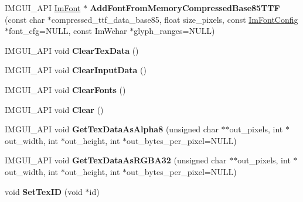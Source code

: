 \begin{DoxyCompactItemize}
\item 
\mbox{\label{struct_im_font_atlas_a8dc978f22a957a7486ab75faeb743813}} 
I\+M\+G\+U\+I\+\_\+\+A\+PI \mbox{\hyperlink{struct_im_font}{Im\+Font}} $\ast$ {\bfseries Add\+Font\+From\+Memory\+Compressed\+Base85\+T\+TF} (const char $\ast$compressed\+\_\+ttf\+\_\+data\+\_\+base85, float size\+\_\+pixels, const \mbox{\hyperlink{struct_im_font_config}{Im\+Font\+Config}} $\ast$font\+\_\+cfg=N\+U\+LL, const Im\+Wchar $\ast$glyph\+\_\+ranges=N\+U\+LL)
\item 
\mbox{\label{struct_im_font_atlas_a97804b3ed2e54b4df70137c88a495d70}} 
I\+M\+G\+U\+I\+\_\+\+A\+PI void {\bfseries Clear\+Tex\+Data} ()
\item 
\mbox{\label{struct_im_font_atlas_a53cc004ffd4bd989e227367eaeb0f142}} 
I\+M\+G\+U\+I\+\_\+\+A\+PI void {\bfseries Clear\+Input\+Data} ()
\item 
\mbox{\label{struct_im_font_atlas_a71af651bcbeb423b06c9b56ab7dc9749}} 
I\+M\+G\+U\+I\+\_\+\+A\+PI void {\bfseries Clear\+Fonts} ()
\item 
\mbox{\label{struct_im_font_atlas_a142f4c3bf3c8909df256ddabd77739c4}} 
I\+M\+G\+U\+I\+\_\+\+A\+PI void {\bfseries Clear} ()
\item 
\mbox{\label{struct_im_font_atlas_ae50261af7f9ba8c89f12814c8176afda}} 
I\+M\+G\+U\+I\+\_\+\+A\+PI void {\bfseries Get\+Tex\+Data\+As\+Alpha8} (unsigned char $\ast$$\ast$out\+\_\+pixels, int $\ast$out\+\_\+width, int $\ast$out\+\_\+height, int $\ast$out\+\_\+bytes\+\_\+per\+\_\+pixel=N\+U\+LL)
\item 
\mbox{\label{struct_im_font_atlas_ac7d71e342139a37e58864075ae39c4f3}} 
I\+M\+G\+U\+I\+\_\+\+A\+PI void {\bfseries Get\+Tex\+Data\+As\+R\+G\+B\+A32} (unsigned char $\ast$$\ast$out\+\_\+pixels, int $\ast$out\+\_\+width, int $\ast$out\+\_\+height, int $\ast$out\+\_\+bytes\+\_\+per\+\_\+pixel=N\+U\+LL)
\item 
\mbox{\label{struct_im_font_atlas_a5e7499eaf4b3b432e966c3ccb167a197}} 
void {\bfseries Set\+Tex\+ID} (void $\ast$id)

\end{DoxyCompactItemize}
